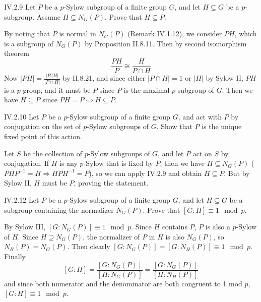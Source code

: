 \begin{problem}{IV.2.9}
Let $P$ be a $p$-Sylow subgroup of a finite group $G$, and let $H \subseteq G$ be a $p$-subgroup. Assume $H \subseteq N_G(P)$. Prove that $H \subseteq P$.
\end{problem}
\begin{pf}
By noting that $P$ is normal in $N_G(P)$ (Remark IV.1.12), we consider $PH$, which is a subgroup of $N_G(P)$ by Proposition II.8.11. Then by second isomorphism theorem
\[
\frac{PH}{P} \cong \frac{H}{P \cap H}	
\]
Now $|PH| = \frac{|P||H|}{|P \cap H|}$ by II.8.21, and since either $|P \cap H| = 1$ or $|H|$ by Sylow II, $PH$ is a $p$-group, and it must be $P$ since $P$ is the maximal $p$-subgroup of $G$. Then we have $H \subseteq P$ since $PH = P \Leftrightarrow H \subseteq P$.
\end{pf}



\begin{problem}{IV.2.10}
Let $P$ be a $p$-Sylow subgroup of a finite group $G$, and act with $P$ by conjugation on the set of $p$-Sylow subgroups of $G$. Show that $P$ is the unique fixed point of this action.
\end{problem}
\begin{pf}
Let $S$ be the collection of $p$-Sylow subgroups of $G$, and let $P$ act on $S$ by conjugation. If $H$ is any $p$-Sylow that is fixed by $P$, then we have $H \subseteq N_G(P)$ ($PHP^{-1} = H \Rightarrow HPH^{-1} = P$), so we can apply IV.2.9 and obtain $H \subseteq P$. But by Sylow II, $H$ must be $P$, proving the statement. 
\end{pf}

\begin{problem}{IV.2.12}
Let $P$ be a $p$-Sylow subgroup of a finite group $G$, and let $H \subseteq G$ be a subgroup containing the normalizer $N_G(P)$. Prove that $[G:H] \equiv 1 \mod p$.
\end{problem}
\begin{pf}
By Sylow III, $[G : N_G(P)] \equiv 1 \mod p $. Since $H$ contains $P$, $P$ is also a $p$-Sylow of $H$. Since $H \supseteq N_G(P)$, the normalizer of $P$ in $H$ is also $N_G(P)$, so $N_H(P) = N_G(P)$. Then clearly $[G : N_G(P)] = [G : N_H(P)] \equiv 1 \mod p$. Finally
\[
[G : H] = \frac{[G : N_G(P)]}{[H : N_G(P)]}	= \frac{[G : N_G(P)]}{[H : N_H(P)]}
\]
and since both numerator and the denominator are both congruent to 1 mod $p$, $[G:H] \equiv 1 \mod p$.
\end{pf}

